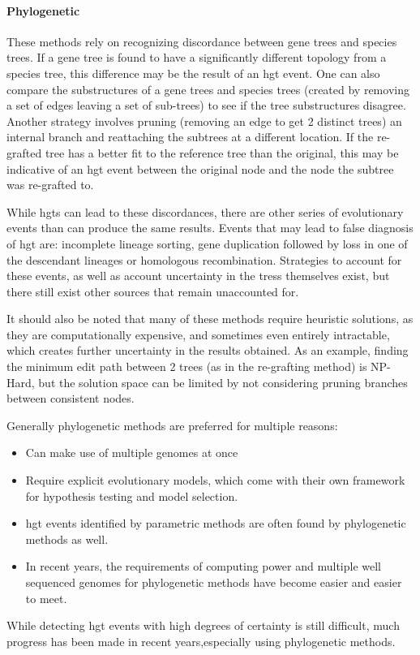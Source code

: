 \documentclass[12pt,letter]{article}
\begin{document}
\paragraph{Phylogenetic}
These methods rely on recognizing discordance between gene trees and species trees.
If a gene tree is found to have a significantly different topology from a species tree, this difference may be the result of an \ac{hgt} event\citep{hgterr}.
One can also compare the substructures of a gene trees and species trees (created by removing a set of edges leaving a set of sub-trees) to see if the tree substructures disagree\citep{ihgt}.
Another strategy involves pruning (removing an edge to get 2 distinct trees) an internal branch and reattaching the subtrees at a different location.
If the re-grafted tree has a better fit to the reference tree than the original, this may be indicative of an \ac{hgt} event between the original node and the node the subtree was re-grafted to\citep{ihgt}.\par
While \ac{hgt}s can lead to these discordances, there are other series of evolutionary events than can produce the same results\citep{hgterr}.
Events that may lead to false diagnosis of \ac{hgt} are: incomplete lineage sorting, gene duplication followed by loss in one of the descendant lineages or homologous recombination\citep{ihgt,hgterr}.
Strategies to account for these events, as well as account uncertainty in the tress themselves exist, but there still exist other sources that remain unaccounted for\citep{hgterr}.\par
It should also be noted that many of these methods require heuristic solutions, as they are computationally expensive, and sometimes even entirely intractable, which creates further uncertainty in the results obtained\citep{ihgt}.
As an example, finding the minimum edit path between 2 trees (as in the re-grafting method) is NP-Hard, but the solution space can be limited by not considering pruning branches between consistent nodes\citep{sprnp,ihgt}.\par\par
Generally phylogenetic methods are preferred for multiple reasons:
\begin{itemize}
    \item Can make use of multiple genomes at once\citep{ihgt}
    \item Require explicit evolutionary models, which come with their own framework for hypothesis testing and model selection\citep{ihgt}.
    \item \ac{hgt} events identified by parametric methods are often found by phylogenetic methods as well\citep{ihgt}.
    \item In recent years, the requirements of computing power and  multiple well sequenced genomes for phylogenetic methods have become easier and easier to meet\citep{ihgt}.
\end{itemize}
While detecting \ac{hgt} events with high degrees of certainty is still difficult, much progress has been made in recent years,especially using phylogenetic methods\citep{ihgt}.
\end{document}
